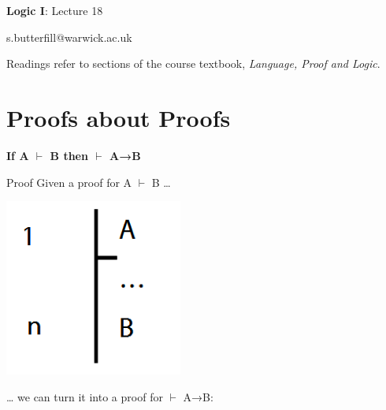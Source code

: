 \documentclass[12pt]{extarticle}
\date{}
\makeatletter
\def \ititle {Origins of Mind}
\def \isubtitle {Lecture 08}
\def \iemail{s.butterfill@warwick.ac.uk}
\makeatother
\begin{document}

\begin{multicols*}{3}

\setlength\footnotesep{1em}







\def \ititle {Logic I}
 
\def \isubtitle {Lecture 18}
 
\begin{center}
 
{\Large
 
\textbf{\ititle}: \isubtitle
 
}
 
 
 
\iemail %
 
\end{center}
 
Readings refer to sections of the course textbook, \emph{Language, Proof and Logic}.
 
 
 
\section{Proofs about Proofs}
 
\begin{minipage}{\columnwidth}
 
\textbf{If A $\vdash$ B then $\vdash$ A→B}
 
Proof Given a proof for A $\vdash$ B …
 
\begin{center}
\includegraphics[scale=0.3]{img/unit_440_a.png}
\end{center}
… we can turn it into a proof for $\vdash$ A→B:
 

\end{minipage}
\end{multicols*}
\end{document}
